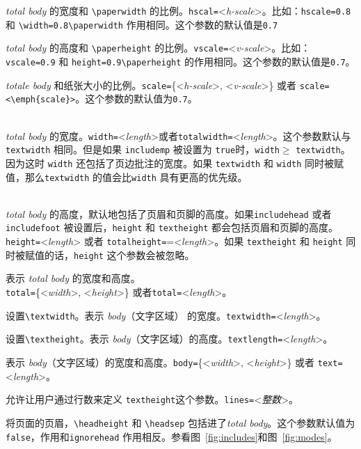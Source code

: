 \documentclass[titlepage]{ctexart}
\newcommand{\gpart}[1]{\textsf{\textsl{\color[rgb]{.0,.45,.7}#1}}}
\newenvironment{Options}%
  {\begin{list}{}{%
   \renewcommand{\makelabel}[1]{\texttt{##1}\hfil}%
   \setlength{\itemsep}{-.5\parsep}
   \settowidth{\labelwidth}{\texttt{xxxxxxxxxxx\space}}%
   \setlength{\leftmargin}{\labelwidth}%
   \addtolength{\leftmargin}{\labelsep}}%
   \raggedright}
  {\end{list}}
\begin{document}
	  \begin{Options}
	  \item[hscale] \gpart{total body} 的宽度和 \verb|\paperwidth| 的比例。\verb|hscal=|<\emph{h-scale}>。比如：\verb|hscale=0.8| 和 \verb|\width=0.8\paperwidth| 作用相同。这个参数的默认值是\verb|0.7|
	  \item[vscale] \gpart{total body} 的高度和 \verb|\paperheight| 的比例。\verb|vscale=|<\emph{v-scale}>。比如：\verb|vscale=0.9| 和 \verb|height=0.9\paperheight| 的作用相同。这个参数的默认值是\verb|0.7|。
	  \item[scale] \gpart{totale body} 和纸张大小的比例。\verb|scale=|\{<\emph{h-scale}>, <\emph{v-scale}>\} 或者 \verb|scale=<\emph{scale}>|。这个参数的默认值为\verb|0.7|。
	  \item[width | totalwidth] ~\\
	  \gpart{total body} 的宽度。\verb|width=|<\emph{length}>或者\verb|totalwidth=|<\emph{length}>。这个参数默认与 \verb|textwidth| 相同。但是如果 \verb|includemp| 被设置为 \verb|true|时，\verb|width|$\ge$ \verb|textwidth|。因为这时 \verb|width| 还包括了页边批注的宽度。如果 \verb|textwidth| 和 \verb|width| 同时被赋值，那么\verb|textwidth| 的值会比\verb|width| 具有更高的优先级。
	  \item[height | totalheight] ~\\
	  \gpart{total body} 的高度，默认地包括了页眉和页脚的高度。如果\verb|includehead| 或者 \verb|includefoot| 被设置后，\verb|height| 和 \verb|textheight| 都会包括页眉和页脚的高度。\verb|height=|<\emph{length}> 或者 \verb|totalheight=|=<\emph{length}>。如果 \verb|textheight| 和 \verb|height| 同时被赋值的话，\verb|height| 这个参数会被忽略。
	  \item[total] 表示 \gpart{total body} 的宽度和高度。\\
	  \verb|total=|\{<\emph{width}>, <\emph{height}>\} 或者\verb|total=|<\emph{length}>。
	  \item[textwidth] 设置\verb|\textwidth|。表示 \gpart{body}（文字区域） 的宽度。\verb|textwidth=|<\emph{length}>。
	  \item[textheight] 设置\verb|\textheight|。表示 \gpart{body}（文字区域）的高度。\verb|textlength=|<\emph{length}>。
	  \item[text | body] 表示 \gpart{body}（文字区域）的宽度和高度。\verb|body=|\{<\emph{width}>, <\emph{height}>\} 或者 \verb|text=|<\emph{length}>。
	  \item[lines] 允许让用户通过行数来定义 \verb|textheight|这个参数。\verb|lines=|<\emph{整数}>。
	  \item[includehead] 将页面的页眉，\verb|\headheight| 和 \verb|\headsep| 包括进了\gpart{total body}。这个参数默认值为 \verb|false|，作用和\verb|ignorehead| 作用相反。参看图~\ref{fig:includes}和图~\ref{fig:modes}。

\end{Options}
\end{document}
